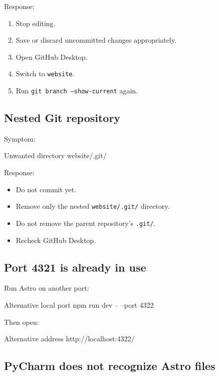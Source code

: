 \documentclass[11pt,letterpaper]{article}
\newcommand{\filepath}[1]{\texttt{#1}}
\newcommand{\branchname}[1]{\texttt{#1}}
\begin{document}
Response:

\begin{enumerate}
    \item Stop editing.
    \item Save or discard uncommitted changes appropriately.
    \item Open GitHub Desktop.
    \item Switch to \branchname{website}.
    \item Run \texttt{git branch --show-current} again.
\end{enumerate}

\subsection{Nested Git repository}

Symptom:

\begin{codebox}{Unwanted directory}
website/.git/
\end{codebox}

Response:

\begin{itemize}
    \item Do not commit yet.
    \item Remove only the nested \filepath{website/.git/} directory.
    \item Do not remove the parent repository's \filepath{.git/}.
    \item Recheck GitHub Desktop.
\end{itemize}

\subsection{Port 4321 is already in use}

Run Astro on another port:

\begin{commandbox}{Alternative local port}
npm run dev -- --port 4322
\end{commandbox}

Then open:

\begin{codebox}{Alternative address}
http://localhost:4322/
\end{codebox}

\subsection{PyCharm does not recognize Astro files}
\end{document}

